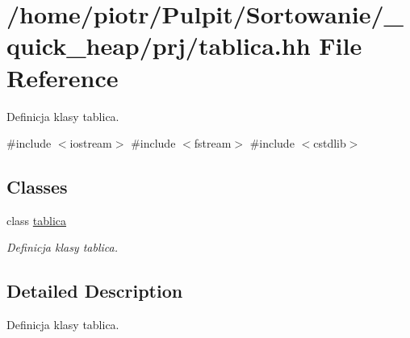\hypertarget{tablica_8hh}{\section{/home/piotr/\-Pulpit/\-Sortowanie/\-\_\-quick\-\_\-heap/prj/tablica.hh \-File \-Reference}
\label{tablica_8hh}
}


\-Definicja klasy tablica.  


{\ttfamily \#include $<$iostream$>$}\*
{\ttfamily \#include $<$fstream$>$}\*
{\ttfamily \#include $<$cstdlib$>$}\*
\subsection*{\-Classes}
\begin{DoxyCompactItemize}
\item 
class \hyperlink{classtablica}{tablica}
\begin{DoxyCompactList}\small\item\em \-Definicja klasy tablica. \end{DoxyCompactList}\end{DoxyCompactItemize}


\subsection{\-Detailed \-Description}
\-Definicja klasy tablica. 